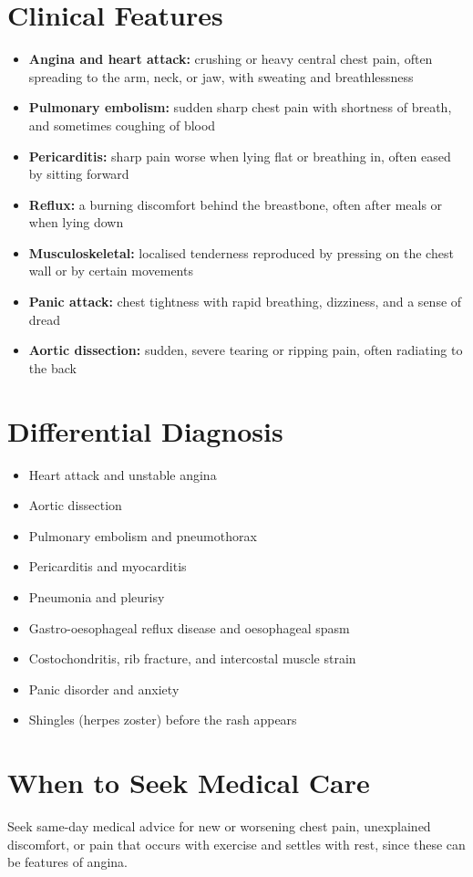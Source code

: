 \section*{Clinical Features}
\begin{itemize}
    \item \textbf{Angina and heart attack:} crushing or heavy central chest pain, often spreading to the arm, neck, or jaw, with sweating and breathlessness
    \item \textbf{Pulmonary embolism:} sudden sharp chest pain with shortness of breath, and sometimes coughing of blood
    \item \textbf{Pericarditis:} sharp pain worse when lying flat or breathing in, often eased by sitting forward
    \item \textbf{Reflux:} a burning discomfort behind the breastbone, often after meals or when lying down
    \item \textbf{Musculoskeletal:} localised tenderness reproduced by pressing on the chest wall or by certain movements
    \item \textbf{Panic attack:} chest tightness with rapid breathing, dizziness, and a sense of dread
    \item \textbf{Aortic dissection:} sudden, severe tearing or ripping pain, often radiating to the back
\end{itemize}

\section*{Differential Diagnosis}
\begin{itemize}
    \item Heart attack and unstable angina
    \item Aortic dissection
    \item Pulmonary embolism and pneumothorax
    \item Pericarditis and myocarditis
    \item Pneumonia and pleurisy
    \item Gastro-oesophageal reflux disease and oesophageal spasm
    \item Costochondritis, rib fracture, and intercostal muscle strain
    \item Panic disorder and anxiety
    \item Shingles (herpes zoster) before the rash appears
\end{itemize}

\section*{When to Seek Medical Care}
Seek same-day medical advice for new or worsening chest pain, unexplained discomfort, or pain that occurs with exercise and settles with rest, since these can be features of angina.

